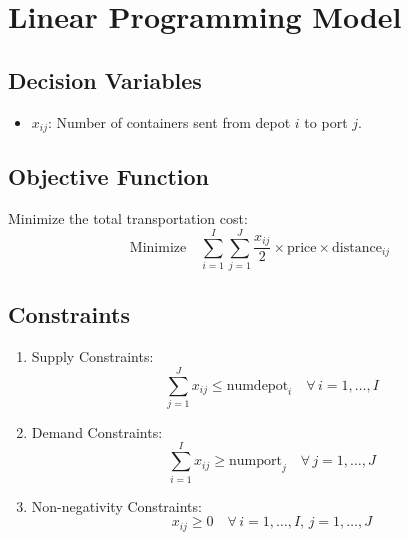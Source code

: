 \documentclass{article}
\begin{document}
\section*{Linear Programming Model}

\subsection*{Decision Variables}
\begin{itemize}
    \item \( x_{ij} \): Number of containers sent from depot \( i \) to port \( j \).
\end{itemize}

\subsection*{Objective Function}
Minimize the total transportation cost:
\[
\text{Minimize} \quad \sum_{i=1}^{I} \sum_{j=1}^{J} \frac{x_{ij}}{2} \times \text{price} \times \text{distance}_{ij}
\]

\subsection*{Constraints}
\begin{enumerate}
    \item Supply Constraints:
    \[
    \sum_{j=1}^{J} x_{ij} \leq \text{numdepot}_{i} \quad \forall \, i = 1, \ldots, I
    \]
    \item Demand Constraints:
    \[
    \sum_{i=1}^{I} x_{ij} \geq \text{numport}_{j} \quad \forall \, j = 1, \ldots, J
    \]
    \item Non-negativity Constraints:
    \[
    x_{ij} \geq 0 \quad \forall \, i = 1, \ldots, I, \, j = 1, \ldots, J
    \]
\end{enumerate}
\end{document}
